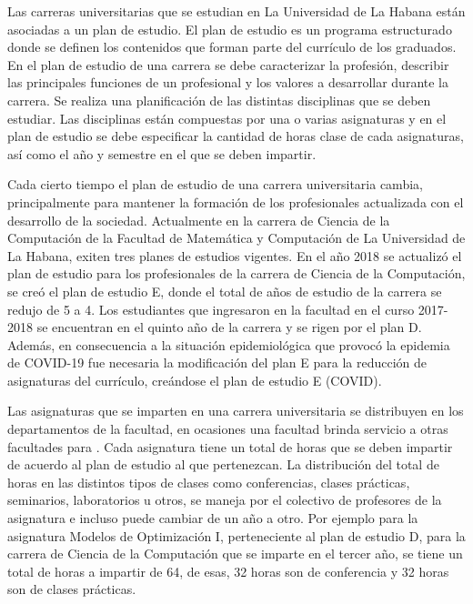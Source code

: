 
Las carreras universitarias que se estudian en La Universidad de La Habana están
asociadas a un plan de estudio. El plan de estudio es un programa estructurado
donde se definen los contenidos que forman parte del currículo de los 
graduados. En el plan de estudio de una carrera 
se debe caracterizar la profesión, describir las principales funciones de un profesional y 
los valores a desarrollar durante la carrera. Se realiza una planificación de las distintas 
disciplinas que se deben estudiar. Las disciplinas están compuestas por una o varias 
asignaturas y en el plan de estudio se debe especificar la cantidad de horas clase de 
cada asignaturas, así como el año y semestre en el que se deben impartir.

Cada cierto tiempo el plan de estudio de una carrera universitaria cambia, principalmente
para mantener la formación de los profesionales actualizada con el desarrollo de la 
sociedad. Actualmente en la carrera de Ciencia de la 
Computación de la Facultad de Matemática 
y Computación de La Universidad de La Habana, exiten tres planes de estudios 
vigentes. En el año 2018 se actualizó el plan de estudio para los profesionales de la 
carrera de Ciencia de la Computación, se creó el plan de estudio E, donde el total de años 
de estudio de la carrera se redujo de 5 a 4. Los estudiantes que ingresaron en la facultad en 
el curso 2017-2018 se encuentran en el quinto año de la carrera y se rigen por el plan D. 
Además, en consecuencia a la situación epidemiológica que provocó la epidemia de COVID-19 
fue necesaria la modificación del plan E para la reducción de asignaturas del currículo, creándose 
el plan de estudio E (COVID).   

Las asignaturas que se imparten en una carrera universitaria se distribuyen 
en los departamentos de la facultad, en ocasiones una facultad brinda servicio a otras facultades
para .  
Cada asignatura tiene un total de horas que se deben impartir de acuerdo 
al plan de estudio al que pertenezcan. La distribución del total de horas 
en las distintos tipos de clases como conferencias, clases prácticas, seminarios, 
laboratorios u otros, se maneja por el colectivo de profesores de la asignatura e incluso
puede cambiar de un año a otro. Por ejemplo para la asignatura Modelos de Optimización I, perteneciente
al plan de estudio D, para la carrera de Ciencia de la Computación que 
se imparte en el tercer año, se tiene un total de horas a impartir de 64,
de esas, 32 horas son de conferencia y 32 horas son de clases prácticas.


